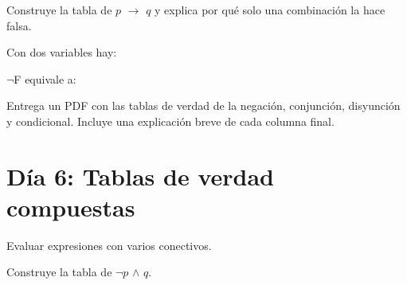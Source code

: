 \begin{activity}[id=dia-05-desarrollo-02,type=long,weight=2]

Construye la tabla de \(p\) \(\to\) \(q\) y explica por qué solo una combinación la hace falsa.

\end{activity}

\begin{activity}[id=dia-05-opcion-01,type=choice,weight=1]

Con dos variables hay:





\end{activity}

\begin{activity}[id=dia-05-opcion-02,type=choice,weight=1]

\(\neg\)F equivale a:





\end{activity}

\begin{deliverable}[id=entrega-dia-05,type=upload,weight=3]

Entrega un PDF con las tablas de verdad de la negación, conjunción, disyunción y condicional. Incluye una explicación breve de cada columna final.

\end{deliverable}

\section{Día 6: Tablas de verdad compuestas}

\begin{lesson}[id=dia-06-lectura,weight=0]

Evaluar expresiones con varios conectivos.

\end{lesson}

\begin{activity}[id=dia-06-corta-01,type=short,weight=1]

Construye la tabla de \(\neg p\) \(\land\) \(q\).

\end{activity}

